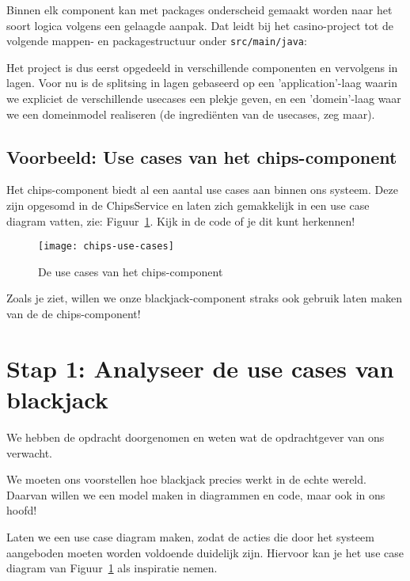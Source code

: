 Binnen elk component kan met packages 
onderscheid gemaakt worden naar het soort logica volgens een gelaagde aanpak. 
Dat leidt bij het casino-project tot de volgende 
mappen- en packagestructuur onder \texttt{src/main/java}:


Het project is dus eerst opgedeeld in verschillende componenten en vervolgens in 
lagen. Voor nu is de splitsing in lagen gebaseerd op een 'application'-laag waarin 
we expliciet de verschillende usecases een plekje geven, en een 'domein'-laag waar 
we een domeinmodel realiseren (de ingrediënten van de usecases, zeg maar).

\subsection{Voorbeeld: Use cases van het chips-component}
Het chips-component biedt al een aantal use cases aan binnen ons systeem.
Deze zijn opgesomd in de ChipsService en laten zich gemakkelijk in een 
use case diagram vatten, zie: Figuur~\ref{fig:chips-use-cases}.
Kijk in de code of je dit kunt herkennen!

\begin{figure}[H]
    \centering
    \texttt{[image: chips-use-cases]}
    \caption{De use cases van het chips-component}
    \label{fig:chips-use-cases}
\end{figure}

Zoals je ziet, willen we onze blackjack-component straks 
ook gebruik laten maken van de de chips-component!

\section{Stap 1: Analyseer de use cases van blackjack}
We hebben de opdracht doorgenomen en weten wat de opdrachtgever van ons verwacht.

We moeten ons voorstellen hoe blackjack precies werkt in de echte wereld.
Daarvan willen we een model maken in diagrammen en code, maar ook in ons hoofd!

Laten we een use case diagram maken, zodat de acties die door het systeem
aangeboden moeten worden voldoende duidelijk zijn. Hiervoor kan je het use case 
diagram van Figuur~\ref{fig:chips-use-cases} als inspiratie nemen.

